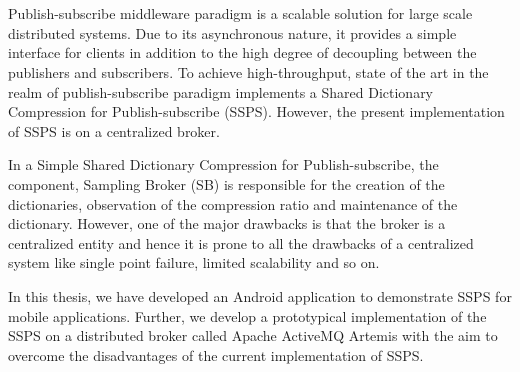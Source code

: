 \chapter{\abstractname}
\setlength{\parskip}{1em}
\setlength\parindent{0pt}

Publish-subscribe middleware paradigm is a scalable solution for large scale distributed systems. Due to its asynchronous nature, it provides a simple interface for clients in addition to the high degree of decoupling between the publishers and subscribers. To achieve high-throughput, state of the art in the realm of publish-subscribe paradigm implements a Shared Dictionary Compression for Publish-subscribe (SSPS). However, the present implementation of SSPS is on a centralized broker.

In a Simple Shared Dictionary Compression for Publish-subscribe, the component, Sampling Broker (SB) is responsible for the creation of the dictionaries, observation of the compression ratio and maintenance of the dictionary. However, one of the major drawbacks is that the broker is a centralized entity and hence it is prone to all the drawbacks of a centralized system like single point failure, limited scalability and so on.

In this thesis, we have developed an Android application to demonstrate SSPS for mobile applications. Further, we develop a prototypical implementation of the SSPS on a distributed broker called Apache ActiveMQ Artemis with the aim to overcome the disadvantages of the current implementation of SSPS. 